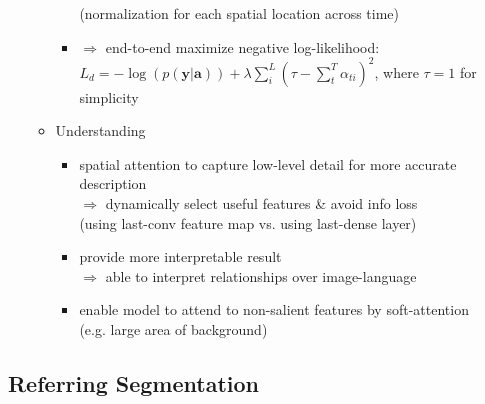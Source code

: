 \begin{itemize}
\begin{itemize}
\begin{itemize}
		(normalization for each spatial location across time)
		\item $\Rightarrow$ end-to-end maximize negative log-likelihood: \\
		$\displaystyle L_d = -\log (p(\mathbf y|\mathbf a)) + \lambda \sum_{i}^L(\tau-\sum_{t}^T \alpha_{ti})^2$, where $\tau=1$ for simplicity
		\end{itemize}
	\item Understanding
		\begin{itemize}
		\item spatial attention to capture low-level detail for more accurate description \\
		$\Rightarrow$ dynamically select useful features \& avoid info loss \\
		(using last-conv feature map vs. using last-dense layer)
		\item provide more interpretable result \\
		$\Rightarrow$ able to interpret relationships over image-language
		\item enable model to attend to non-salient features by soft-attention \\
		(e.g. large area of background)
		\end{itemize}
	\end{itemize}
\end{itemize}


\subsection{Referring Segmentation}
